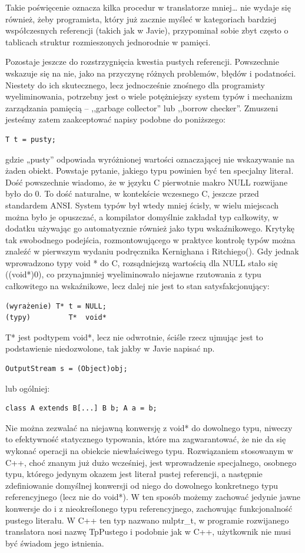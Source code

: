 Takie poświęcenie oznacza kilka procedur w translatorze mniej… nie wydaje się również, żeby programista, który już zacznie myśleć w kategoriach bardziej współczesnych referencji (takich jak w Javie), przypominał sobie zbyt często o tablicach struktur rozmieszonych jednorodnie w pamięci.

Pozostaje jeszcze do rozstrzygnięcia kwestia pustych referencji. Powszechnie wskazuje się na nie, jako na przyczynę różnych problemów, błędów i podatności. Niestety do ich skutecznego, lecz jednocześnie znośnego dla programisty wyeliminowania, potrzebny jest o wiele potężniejszy system typów i mechanizm zarządzania pamięcią – ,,garbage collector'' lub ,,borrow checker''. Zmuszeni jesteśmy zatem zaakceptować napisy podobne do poniższego:
\begin{lstlisting}
T t = pusty;    
\end{lstlisting}
 gdzie „pusty” odpowiada wyróżnionej wartości oznaczającej nie wskazywanie na żaden obiekt. Powstaje  pytanie, jakiego typu powinien być ten specjalny literał. Dość powszechnie wiadomo, że w języku C pierwotnie makro NULL rozwijane było do 0.\cite[str.~214]{KiR} To dość naturalne, w kontekście wczesnego C, jeszcze przed standardem ANSI. System typów był wtedy mniej ścisły, w wielu miejscach można było je opuszczać, a kompilator domyślnie zakładał typ całkowity, w dodatku używając go automatycznie również jako typu wskaźnikowego. Krytykę tak swobodnego podejścia, rozmontowującego w praktyce kontrolę typów można znaleźć w pierwszym wydaniu podręcznika Kernighana i Ritchiego(\cite{KiR}). Gdy jednak wprowadzono  typy void * do C, rozsądniejszą wartością dla NULL stało się ((void*)0), co przynajmniej wyeliminowało niejawne rzutowania z typu całkowitego na wskaźnikowe, lecz dalej nie jest to stan satysfakcjonujący:
\begin{lstlisting}
(wyrażenie) T* t = NULL;
(typy)         T*  void*
\end{lstlisting}
T* jest podtypem void*, lecz nie odwrotnie, ściśle rzecz ujmując jest to podstawienie niedozwolone, tak jakby w Javie napisać np.
\begin{lstlisting}
OutputStream s = (Object)obj;
\end{lstlisting}
lub ogólniej:
\begin{lstlisting}
class A extends B[...] B b; A a = b;
\end{lstlisting}
Nie można zezwalać na niejawną konwersję z void* do dowolnego typu, niweczy to efektywność statycznego typowania, które ma zagwarantować, że nie da się wykonać operacji na obiekcie niewłaściwego typu. Rozwiązaniem stosowanym w C++, choć znanym już dużo wcześniej\cite[str.256 - zob. nil\_typ]{waite_goos}, jest wprowadzenie specjalnego, osobnego typu, którego jedynym okazem jest literał pustej referencji, a następnie zdefiniowanie domyślnej konwersji od niego do dowolnego konkretnego typu referencyjnego (lecz nie do void*). W ten sposób możemy zachować jedynie jawne konwersje do i z nieokreślonego typu referencyjnego,  zachowując funkcjonalność pustego literału. W C++ ten typ nazwano nulptr\_t, w programie rozwijanego translatora nosi nazwę TpPustego i podobnie jak w C++, użytkownik nie musi być świadom jego istnienia.
